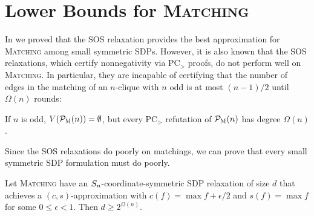 \section{Lower Bounds for \textsc{Matching}}
In  we proved that the SOS relaxation provides the best approximation for \textsc{Matching} among small symmetric SDPs. However, it is also known that the SOS relaxations, which certify nonnegativity via PC$_>$ proofs, do not perform well on \textsc{Matching}. In particular, they are incapable of certifying that the number of edges in the matching of an $n$-clique with $n$ odd is at most $(n-1)/2$ until $\Omega(n)$ rounds:
\begin{theorem}\label{thm:grigoriev}
If $n$ is odd, $V(\mathcal P_{\textsc{M}}(n)) = \emptyset$, but every PC$_>$ refutation of $\mathcal P_{\textsc{M}}(n)$ has degree $\Omega(n)$.
\end{theorem}
Since the SOS relaxations do poorly on matchings, we can prove that every small symmetric SDP formulation must do poorly.
\begin{theorem}
Let \textsc{Matching} have an $S_{n}$-coordinate-symmetric SDP relaxation of size $d$ that achieves a $(c,s)$-approximation with $c(f) = \max f + \epsilon/2$ and $s(f) = \max f$ for some $0 \leq \epsilon < 1$. Then $d \geq 2^{\Omega(n)}$.
\end{theorem}
